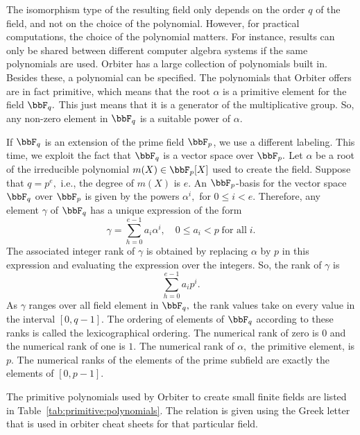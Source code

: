 \bigskip


The isomorphism type of the resulting field 
only depends on the order $q$ of the field, 
and not on the choice of the polynomial. 
However, for practical computations, the choice of the polynomial matters. 
For instance, results can only be shared between 
different computer algebra systems if the same polynomials are used.
Orbiter has a large collection of polynomials built in. 
Besides these, a polynomial can be specified.
The polynomials that Orbiter offers are in fact primitive, which means that the 
root $\alpha$ is a primitive element for the field $\bbF_q.$ 
This just means that it is a generator of the multiplicative group. 
So, any non-zero element in $\bbF_q$ 
is a suitable power of $\alpha.$


\bigskip

If $\bbF_q$ is an extension of the prime field $\bbF_p$, 
we use a different labeling.
This time, we exploit the fact that $\bbF_q$ is a vector space over $\bbF_p.$
Let $\alpha$ be a root of the irreducible polynomial 
$m(X)\in \bbF_p[X]$ used to create the field. 
Suppose that $q=p^e,$ i.e., the degree of $m(X)$  is $e$.
An $\bbF_p$-basis for the vector space $\bbF_q$ over $\bbF_p$ is given by the powers 
$\alpha^i,$ for $0 \le i < e.$ 
Therefore, any element $\gamma$ of $\bbF_q$ 
has a unique expression of the form 
$$
\gamma = \sum_{h=0}^{e-1} a_i \alpha^i, \quad  0 \le a_i < p  \;\mbox{for all} \; i.
$$
The associated integer rank of $\gamma$ 
is obtained by replacing $\alpha$ by $p$ in this expression 
and evaluating the expression over the integers. 
So, the rank of $\gamma$ is 
$$
\sum_{h=0}^{e-1} a_i p^i.
$$
As $\gamma$ ranges over all field element in $\bbF_q,$ 
the rank values take on every value in the interval $[0,q-1].$ 
The ordering of elements of $\bbF_q$ according 
to these ranks is called the lexicographical ordering. 
The numerical rank of zero is $0$ and the numerical rank of one is $1$.
The numerical rank of $\alpha,$ the primitive element, is $p.$
The numerical ranks of the elements of 
the prime subfield are exactly the elements of $[0,p-1].$

\bigskip

The primitive polynomials used by Orbiter to create small finite fields 
are listed in Table~\ref{tab:primitive:polynomials}. 
The relation is given using the Greek letter that 
is used in orbiter cheat sheets for that particular field.


